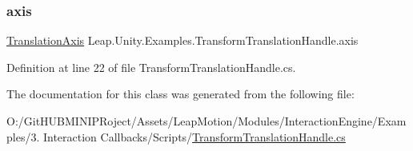 \subsubsection{\texorpdfstring{axis}{axis}}
{\footnotesize\ttfamily \mbox{\hyperlink{namespace_leap_1_1_unity_1_1_examples_a76ed01cc0aaa8ede4fc75e38919a60a5}{Translation\+Axis}} Leap.\+Unity.\+Examples.\+Transform\+Translation\+Handle.\+axis}



Definition at line 22 of file Transform\+Translation\+Handle.\+cs.



The documentation for this class was generated from the following file\+:\begin{DoxyCompactItemize}
\item 
O\+:/\+Git\+H\+U\+B\+M\+I\+N\+I\+P\+Roject/\+Assets/\+Leap\+Motion/\+Modules/\+Interaction\+Engine/\+Examples/3. Interaction Callbacks/\+Scripts/\mbox{\hyperlink{_transform_translation_handle_8cs}{Transform\+Translation\+Handle.\+cs}}\end{DoxyCompactItemize}
